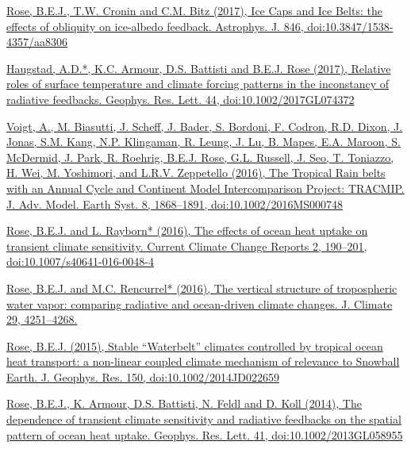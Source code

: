 \documentclass[11pt, letterpaper]{article} %
\newcommand{\years}[1]{\marginnote{\scriptsize #1}} %
\newcommand{\publink}{http://www.atmos.albany.edu/facstaff/brose/resources/Publications/}
\begin{document}
\href{\publink Rose_2017_ApJ_846_28.pdf}{\underline{Rose, B.E.J.}, T.W. Cronin and C.M. Bitz (2017), Ice Caps and Ice Belts: the effects of obliquity on ice-albedo feedback. Astrophys. J. 846, doi:10.3847/1538-4357/aa8306}
\vspace{0.2 cm}

\href{\publink Haugstad_et_al-2017-Geophysical_Research_Letters.pdf}{Haugstad, A.D.*, K.C. Armour, D.S. Battisti and \underline{B.E.J. Rose} (2017), Relative roles of surface temperature and climate forcing patterns in the inconstancy of radiative feedbacks. Geophys. Res. Lett. 44, doi:10.1002/2017GL074372}
\vspace{0.2 cm}

\years{2016}
\href{\publink Voigt_et_al-2016-TRACMIP.pdf}{Voigt, A., M. Biasutti, J. Scheff, J. Bader, S. Bordoni, F. Codron, R.D. Dixon, J. Jonas, S.M. Kang, N.P. Klingaman, R. Leung, J. Lu, B. Mapes, E.A. Maroon, S. McDermid, J. Park, R. Roehrig, \underline{B.E.J. Rose}, G.L. Russell, J. Seo, T. Toniazzo, H. Wei, M. Yoshimori, and L.R.V. Zeppetello (2016), The Tropical Rain belts with an Annual Cycle and Continent Model Intercomparison Project: TRACMIP. J. Adv. Model. Earth Syst. 8, 1868--1891, doi:10.1002/2016MS000748}
\vspace{0.2 cm}
 
\href{\publink Rose_Rayborn_CCCR2016.pdf}{\underline{Rose, B.E.J.} and L. Rayborn* (2016), The effects of ocean heat uptake on transient climate sensitivity. Current Climate Change Reports 2, 190--201, doi:10.1007/s40641-016-0048-4}
\vspace{0.2 cm}
   
\href{\publink Rose_Rencurrel_JClim2016.pdf}{\underline{Rose, B.E.J.} and M.C. Rencurrel* (2016), The vertical structure of tropospheric water vapor: comparing radiative and ocean-driven climate changes. J. Climate 29, 4251--4268.}
\vspace{0.2 cm}
 
\years{2015}  
\href{\publink Rose_JGR2015.pdf}{\underline{Rose, B.E.J.} (2015), Stable ``Waterbelt'' climates controlled by tropical ocean heat transport: a non-linear coupled climate mechanism of relevance to Snowball Earth. J. Geophys. Res. 150, doi:10.1002/2014JD022659}
\vspace{0.2 cm}
 
\years{2014}  
\href{\publink Rose_etal_GRL2014.pdf}{\underline{Rose, B.E.J.}, K. Armour, D.S. Battisti, N. Feldl and D. Koll (2014), The dependence of transient climate sensitivity and radiative feedbacks on the spatial pattern of ocean heat uptake. Geophys. Res. Lett. 41, doi:10.1002/2013GL058955}
 \vspace{0.2 cm}
 
\end{document}
